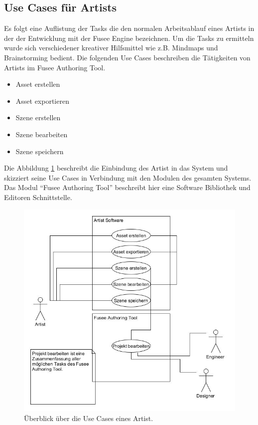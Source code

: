 \documentclass[pagesize, paper=a4, fontsize=12pt, titlepage=true, headings=small, headnosepline, abstractoff, liststotoc, nochapterprefix, plainheadsepline, twoside]{scrreprt}
\begin{document}
\subsection{Use Cases für Artists}
Es folgt eine Auflistung der Tasks die den normalen Arbeitsablauf eines Artists in der der Entwicklung mit der Fusee Engine bezeichnen. Um die Tasks zu ermitteln wurde sich verschiedener kreativer Hilfsmittel wie z.B. Mindmaps und Brainstorming bedient. Die folgenden Use Cases beschreiben die Tätigkeiten von Artists im Fusee Authoring Tool.
\begin{itemize}
\item Asset erstellen
\item Asset exportieren
\item Szene erstellen
\item Szene bearbeiten
\item Szene speichern
\end{itemize}

Die Abbildung \ref{UseCaseArtist} beschreibt die Einbindung des Artist in das System und skizziert seine Use Cases in Verbindung mit den Modulen des gesamten Systems. Das Modul “Fusee Authoring Tool” beschreibt hier eine Software Bibliothek und Editoren Schnittstelle.
\begin{figure}[ht]
	\centering
	\includegraphics[width=\linewidth]{Bilder/UseCase_Artist.jpg}
	\caption{Überblick über die Use Cases eines Artist.}
	\label{UseCaseArtist}
\end{figure}
\end{document}
